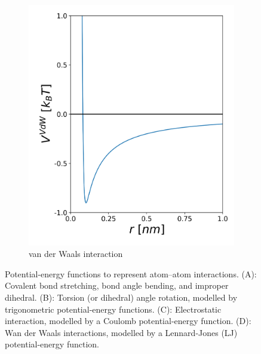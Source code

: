\begin{figure}[h!]
\begin{subfigure}{0.45\textwidth}
        \includegraphics[width=\textwidth]{2_chapter_intro/fig/ForceField/vdwV.png}
        \caption{van der Waals interaction}
	\label{sfig: lj}
    \end{subfigure}
    \caption{Potential-energy functions to represent atom--atom interactions. (A): Covalent bond stretching, bond angle bending, and improper dihedral. (B): Torsion (or dihedral) angle rotation, modelled by trigonometric potential-energy functions. (C): Electrostatic interaction, modelled by a Coulomb potential-energy function. (D): Wan der Waals interactions, modelled by a Lennard-Jones (LJ) potential-energy function.}
    \label{fig:FF_Functions}
\end{figure}

